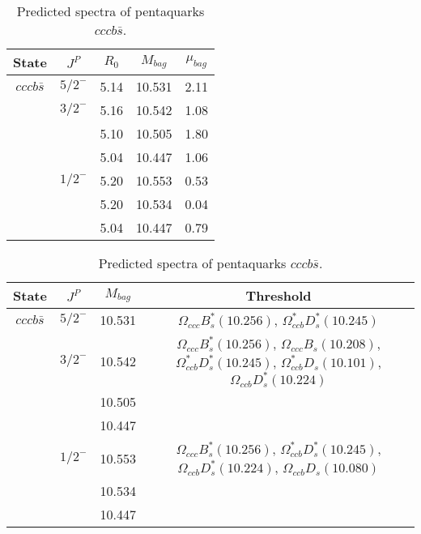 \documentclass[prd,twocolumn,floatfix,nofootinbib]{revtex4}
\begin{document}
\renewcommand{\tabcolsep}{0.5cm}
\renewcommand{\arraystretch}{1.2}
\begin{table*}[!htbp]
    \caption{Predicted spectra of pentaquarks $cccb\bar{s}$.}
    \begin{tabular}{ccccc}
        \hline\hline
        {\rm State} &$J^{P}$ &$R_{0}$ &$M_{bag}$ &$\mu_{bag}$ \\ \hline
        ${cccb\bar{s}}$
            &${5/2}^{-}$    &5.14   &10.531 &2.11 \\
            &${3/2}^{-}$    &5.16   &10.542 &1.08 \\
            &               &5.10   &10.505 &1.80 \\
            &               &5.04   &10.447 &1.06 \\
            &${1/2}^{-}$    &5.20   &10.553 &0.53 \\
            &               &5.20   &10.534 &0.04 \\
            &               &5.04   &10.447 &0.79 \\
        \hline\hline
    \end{tabular}
\end{table*}

\renewcommand{\tabcolsep}{0.5cm}
\renewcommand{\arraystretch}{1.2}
\begin{table*}[!htbp]
    \caption{Predicted spectra of pentaquarks $cccb\bar{s}$.}
    \begin{tabular}{cccc}
        \hline\hline
        {\rm State} &$J^{P}$ &$M_{bag}$ &Threshold \\ \hline
        ${cccb\bar{s}}$
            &${5/2}^{-}$    &10.531 &$\Omega_{ccc} B^{\ast}_{s}(10.256)$, $\Omega^{\ast}_{ccb} D^{\ast}_{s}(10.245)$ \\
            &${3/2}^{-}$    &10.542 &$\Omega_{ccc} B^{\ast}_{s}(10.256)$, $\Omega_{ccc} B_{s}(10.208)$, $\Omega^{\ast}_{ccb} D^{\ast}_{s}(10.245)$, $\Omega^{\ast}_{ccb} D_{s}(10.101)$, $\Omega_{ccb} D^{\ast}_{s}(10.224)$ \\
            &               &10.505 & \\
            &               &10.447 & \\
            &${1/2}^{-}$    &10.553 &$\Omega_{ccc} B^{\ast}_{s}(10.256)$, $\Omega^{\ast}_{ccb} D^{\ast}_{s}(10.245)$, $\Omega_{ccb} D^{\ast}_{s}(10.224)$, $\Omega_{ccb} D_{s}(10.080)$ \\
            &               &10.534 & \\
            &               &10.447 & \\
        \hline\hline
    \end{tabular}
\end{table*}
\end{document}
